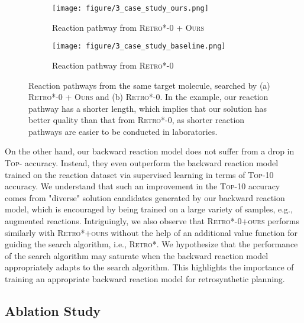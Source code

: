 \begin{figure*}[t!]
\vspace{0.1in}
\centering
\begin{subfigure}{0.44730671739\textwidth}
\centering
\texttt{[image: figure/3\_case\_study\_ours.png]}
\caption{Reaction pathway from \textsc{Retro*-0 + Ours}}
\end{subfigure}
\begin{subfigure}{0.50269328261\textwidth}
\centering
\texttt{[image: figure/3\_case\_study\_baseline.png]}
\caption{Reaction pathway from \textsc{Retro*-0}}
\end{subfigure}
\caption{Reaction pathways from the same target molecule, searched by (a) \textsc{Retro*-0 + Ours} and (b) \textsc{Retro*-0}. In the example, our reaction pathway has a shorter length, which implies that our solution has better quality than that from \textsc{Retro*-0}, as shorter reaction pathways are easier to be conducted in laboratories.}
\label{fig:case_study}
\end{figure*} On the other hand, our backward reaction model does not suffer from a drop in \textsc{Top-} accuracy. Instead, they even outperform the backward reaction model trained on the reaction dataset  via supervised learning in terms of \textsc{Top-10} accuracy. 
We understand that such an improvement in the \textsc{Top-10} accuracy comes from "diverse" solution candidates generated by our backward reaction model, which is encouraged by being trained on a large variety of samples, e.g., augmented reactions.
Intriguingly, we also observe that \textsc{Retro*-0+ours} performs similarly with \textsc{Retro*+ours} without the help of an additional value function for guiding the search algorithm, i.e., \textsc{Retro*}. We hypothesize that the performance of the search algorithm may saturate when the backward reaction model appropriately adapts to the search algorithm. This highlights the importance of training an appropriate backward reaction model for retrosynthetic planning. 



















\subsection{Ablation Study}

